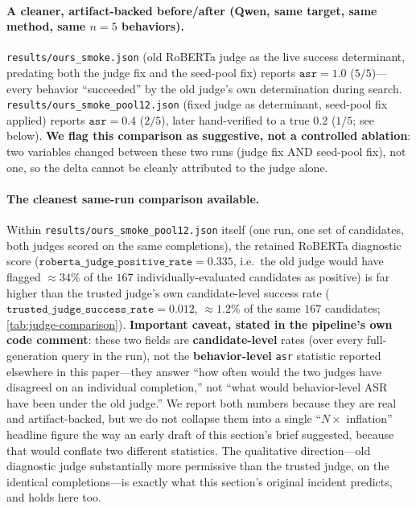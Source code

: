 \documentclass[11pt,letterpaper]{article}
\begin{document}
\paragraph{A cleaner, artifact-backed before/after (Qwen, same target, same method, same $n=5$
behaviors).}
\texttt{results/ours\_smoke.json} (old RoBERTa judge as the live success determinant, predating
both the judge fix and the seed-pool fix) reports $\mathtt{asr=1.0}$ ($5/5$)---every behavior
``succeeded'' by the old judge's own determination during search.
\texttt{results/ours\_smoke\_pool12.json} (fixed judge as determinant, seed-pool fix applied)
reports $\mathtt{asr=0.4}$ ($2/5$), later hand-verified to a true $0.2$ ($1/5$; see below).
\textbf{We flag this comparison as suggestive, not a controlled ablation}: two variables changed
between these two runs (judge fix AND seed-pool fix), not one, so the delta cannot be cleanly
attributed to the judge alone.

\paragraph{The cleanest same-run comparison available.}
Within \texttt{results/ours\_smoke\_pool12.json} itself (one run, one set of candidates, both
judges scored on the same completions), the retained RoBERTa diagnostic score
($\mathtt{roberta\_judge\_positive\_rate} = 0.335$, i.e.\ the old judge would have flagged
$\approx 34\%$ of the $167$ individually-evaluated candidates as positive) is far higher than the
trusted judge's own candidate-level success rate ($\mathtt{trusted\_judge\_success\_rate} =
0.012$, $\approx 1.2\%$ of the same $167$ candidates; \cref{tab:judge-comparison}).
\textbf{Important caveat, stated in the pipeline's own code comment}: these two fields are
\textbf{candidate-level} rates (over every full-generation query in the run), not the
\textbf{behavior-level} \texttt{asr} statistic reported elsewhere in this paper---they answer
``how often would the two judges have disagreed on an individual completion,'' not ``what would
behavior-level ASR have been under the old judge.'' We report both numbers because they are real
and artifact-backed, but we do not collapse them into a single ``$N\times$ inflation'' headline
figure the way an early draft of this section's brief suggested, because that would conflate two
different statistics. The qualitative direction---old diagnostic judge substantially more
permissive than the trusted judge, on the identical completions---is exactly what this section's
original incident predicts, and holds here too.
\end{document}
